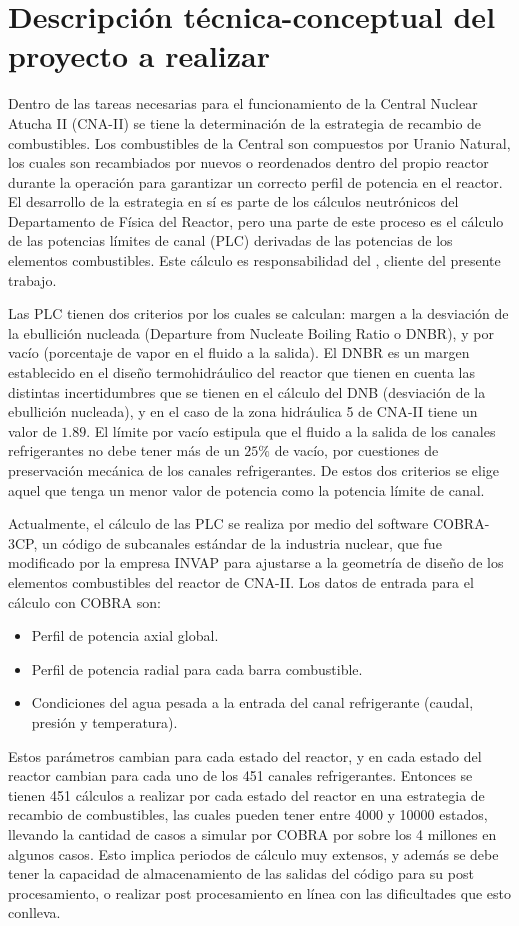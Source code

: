 \documentclass[
11pt, %
]{charter}
\newcommand{\CNA}{Central Nuclear Atucha II}
\begin{document}
\section{Descripción técnica-conceptual del proyecto a realizar}
\label{sec:descripcion}

Dentro de las tareas necesarias para el funcionamiento de la \CNA{} (CNA-II) se tiene la determinación de la estrategia de recambio de combustibles. Los combustibles de la Central son compuestos por Uranio Natural, los cuales son recambiados por nuevos o reordenados dentro del propio reactor durante la operación para garantizar un correcto perfil de potencia en el reactor. El desarrollo de la estrategia en sí es parte de los cálculos neutrónicos del Departamento de Física del Reactor, pero una parte de este proceso es el cálculo de las potencias límites de canal (PLC) derivadas de las potencias de los elementos combustibles. Este cálculo es responsabilidad del \clientename{}, cliente del presente trabajo.

Las PLC tienen dos criterios por los cuales se calculan: margen a la desviación de la ebullición nucleada (Departure from Nucleate Boiling Ratio o DNBR), y por vacío (porcentaje de vapor en el fluido a la salida). El DNBR es un margen establecido en el diseño termohidráulico del reactor que tienen en cuenta las distintas incertidumbres que se tienen en el cálculo del DNB (desviación de la ebullición nucleada), y en el caso de la zona hidráulica 5 de CNA-II tiene un valor de $1.89$. El límite por vacío estipula que el fluido a la salida de los canales refrigerantes no debe tener más de un $25\%$ de vacío, por cuestiones de preservación mecánica de los canales refrigerantes. De estos dos criterios se elige aquel que tenga un menor valor de potencia como la potencia límite de canal.

Actualmente, el cálculo de las PLC se realiza por medio del software COBRA-3CP, un código de subcanales estándar de la industria nuclear, que fue modificado por la empresa INVAP para ajustarse a la geometría de diseño de los elementos combustibles del reactor de CNA-II. Los datos de entrada para el cálculo con COBRA son:
\begin{itemize}
  \item Perfil de potencia axial global.
  \item Perfil de potencia radial para cada barra combustible.
  \item Condiciones del agua pesada a la entrada del canal refrigerante (caudal, presión y temperatura).
\end{itemize}
Estos parámetros cambian para cada estado del reactor, y en cada estado del reactor cambian para cada uno de los 451 canales refrigerantes. Entonces se tienen 451 cálculos a realizar por cada estado del reactor en una estrategia de recambio de combustibles, las cuales pueden tener entre 4000 y 10000 estados, llevando la cantidad de casos a simular por COBRA por sobre los 4 millones en algunos casos. Esto implica periodos de cálculo muy extensos, y además se debe tener la capacidad de almacenamiento de las salidas del código para su post procesamiento, o realizar post procesamiento en línea con las dificultades que esto conlleva. 
\end{document}
